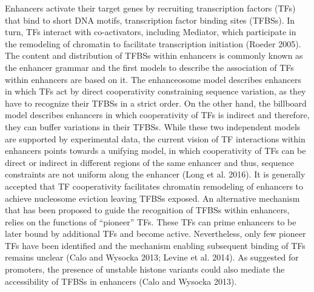 Enhancers activate their target genes by recruiting transcription factors (TFs) that bind to short DNA motifs, transcription factor binding sites (TFBSs). In turn, TFs interact with co-activators, including Mediator, which participate in the remodeling of chromatin to facilitate transcription initiation (Roeder 2005). The content and distribution of TFBSs within enhancers is commonly known as the enhancer grammar and the first models to describe the association of TFs within enhancers are based on it. The enhanceosome model describes enhancers in which TFs act by direct cooperativity constraining sequence variation, as they have to recognize their TFBSs in a strict order. On the other hand, the billboard model describes enhancers in which cooperativity of TFs is indirect and therefore, they can buffer variations in their TFBSs. While these two independent models are supported by experimental data, the current vision of TF interactions within enhancers points towards a unifying model, in which cooperativity of TFs can be direct or indirect in different regions of the same enhancer and thus, sequence constraints are not uniform along the enhancer (Long et al. 2016). It is generally accepted that TF cooperativity facilitates chromatin remodeling of enhancers to achieve nucleosome eviction leaving TFBSs exposed. An alternative mechanism that has been proposed to guide the recognition of TFBSs within enhancers, relies on the functions of ``pioneer'' TFs. These TFs can prime enhancers to be later bound by additional TFs and become active. Nevertheless, only few pioneer TFs have been identified and the mechanism enabling subsequent binding of TFs remains unclear (Calo and Wysocka 2013; Levine et al. 2014). As suggested for promoters, the presence of unstable histone variants could also mediate the accessibility of TFBSs in enhancers (Calo and Wysocka 2013).\\

